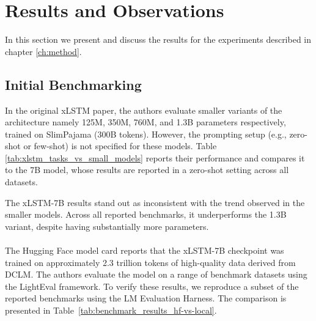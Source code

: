 \section{Results and Observations}
\label{ch:experiments}

In this section we present and discuss the results for the experiments described in 
chapter \ref{ch:method}. 

\subsection{Initial Benchmarking}
In the original xLSTM paper, the authors evaluate smaller variants of the architecture 
namely 125M, 350M, 760M, and 1.3B parameters respectively, trained on SlimPajama (300B tokens). 
However, the prompting setup (e.g., zero-shot or few-shot) is not specified 
for these models. Table \ref{tab:xlstm_tasks_vs_small_models} reports their 
performance and compares it to the 7B model, whose results are reported in a 
zero-shot setting across all datasets.
%
\begin{table}[H]
\centering
{}
\caption{Task-Specific Performance Metrics for xLSTM at different sizes}
\label{tab:xlstm_tasks_vs_small_models}
\end{table}
%
\noindent The xLSTM-7B results stand out as inconsistent with the trend observed in the smaller models. 
Across all reported benchmarks, it underperforms the 1.3B variant, 
despite having substantially more parameters.
\\ \\
The Hugging Face model card reports that the xLSTM-7B checkpoint was trained on approximately 2.3 trillion tokens of high-quality data 
derived from DCLM. The authors evaluate the model on a range of benchmark datasets using the LightEval
framework. To verify these results, we reproduce a subset of the reported benchmarks using the
LM Evaluation Harness. The comparison is presented in Table~\ref{tab:benchmark_results_hf-vs-local}.\\ \\
 
